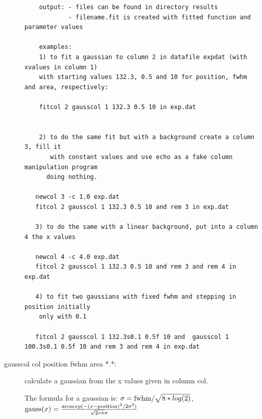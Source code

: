 \begin{description}
\begin{verbatim}
    output: - files can be found in directory results
            - filename.fit is created with fitted function and parameter values

    examples:
    1) to fit a gaussian to column 2 in datafile expdat (with xvalues in column 1)
    with starting values 132.3, 0.5 and 10 for position, fwhm and area, respectively:

    fitcol 2 gausscol 1 132.3 0.5 10 in exp.dat


    2) to do the same fit but with a background create a column 3, fill it
       with constant values and use echo as a fake column manipulation program
      doing nothing.

   newcol 3 -c 1.0 exp.dat
   fitcol 2 gausscol 1 132.3 0.5 10 and rem 3 in exp.dat

   3) to do the same with a linear background, put into a column 4 the x values

   newcol 4 -c 4.0 exp.dat
   fitcol 2 gausscol 1 132.3 0.5 10 and rem 3 and rem 4 in exp.dat

   4) to fit two gaussians with fixed fwhm and stepping in position initially
    only with 0.1

   fitcol 2 gausscol 1 132.3s0.1 0.5f 10 and  gausscol 1 100.3s0.1 0.5f 10 and rem 3 and rem 4 in exp.dat
\end{verbatim}

\item[\prg gausscol\index{gausscol} col position fwhm area *.*:]  calculate a
gaussian from the x values given in column col.

The formula for a gaussian is:
$\sigma={\rm fwhm}/\sqrt{8*log(2)}$,
${\rm gauss}(x)=\frac{{\rm area} exp(-(x-{\rm position})^2/2 \sigma^2)}{\sqrt{2*\pi}\sigma}$


\end{description}
